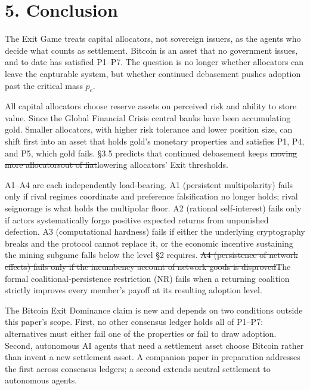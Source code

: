 \documentclass[12pt]{article}
\theoremstyle{definition}
\theoremstyle{remark}
\providecommand{\DIFaddtex}[1]{{\color{AddedText}#1}}
\providecommand{\DIFdeltex}[1]{{\color{DeletedText}\sout{#1}}}
\providecommand{\DIFaddbegin}{}
\providecommand{\DIFaddend}{}
\providecommand{\DIFdelbegin}{}
\providecommand{\DIFdelend}{}
\providecommand{\DIFadd}[1]{\texorpdfstring{\DIFaddtex{#1}}{#1}} %
\providecommand{\DIFdel}[1]{\texorpdfstring{\DIFdeltex{#1}}{}} %
\begin{document}

\section{5. Conclusion}

The Exit Game treats capital allocators, not sovereign issuers, as the agents who decide what counts as settlement. Bitcoin is an asset that no government issues, and to date has satisfied P1--P7. The question is no longer whether allocators can leave the capturable system, but whether continued debasement pushes adoption past the critical mass $p_c$.

All capital allocators choose reserve assets on perceived risk and ability to store value. Since the Global Financial Crisis central banks have been accumulating gold. Smaller allocators, with higher risk tolerance and lower position size, can shift first into an asset that holds gold's monetary properties and satisfies P1, P4, and P5, which gold fails. \S3.5 predicts that continued debasement keeps \DIFdelbegin \DIFdel{moving more allocatorsout of fiat}\DIFdelend \DIFaddbegin \DIFadd{lowering allocators' Exit thresholds}\DIFaddend .

A1--A4 are each independently load-bearing. A1 (persistent multipolarity) fails only if rival regimes coordinate and preference falsification no longer holds; rival seignorage is what holds the multipolar floor. A2 (rational self-interest) fails only if actors systematically forgo positive expected returns from unpunished defection. A3 (computational hardness) fails if either the underlying cryptography breaks and the protocol cannot replace it, or the economic incentive sustaining the mining subgame falls below the level §2 requires. \DIFdelbegin \DIFdel{A4 (persistence of network effects) fails only if the incumbency account of network goods is disproved}\DIFdelend \DIFaddbegin \DIFadd{The formal coalitional-persistence restriction (NR) fails when a returning coalition strictly improves every member's payoff at its resulting adoption level}\DIFaddend .

The Bitcoin Exit Dominance claim is new and depends on two conditions outside this paper's scope. First, no other consensus ledger holds all of P1--P7: alternatives must either fail one of the properties or fail to draw adoption. Second, autonomous AI agents that need a settlement asset choose Bitcoin rather than invent a new settlement asset. A companion paper in preparation addresses the first across consensus ledgers; a second extends neutral settlement to autonomous agents.
\end{document}
